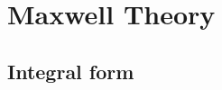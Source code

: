 
%

\def\red#1{{\color{red}#1}}
\def\blue#1{{\color{blue}#1}}
\def\green#1{{\color{green}#1}}

\usepackage{placeins}

\def\gap{38mm}

\usepackage{amsthm} %
\theoremstyle{definition}
\newtheorem{definition}{Definition}
\theoremstyle{plain}
\newtheorem{proposition}{Proposition}
\newtheorem{lemma}{Lemma}
\newtheorem{theorem}{Theorem}
\newtheorem{corollary}{Corollary}
\newtheorem{conjecture}{Conjecture}
\newtheorem{example}{Example}
\newtheorem{result}{Result}
\newtheorem{claim}{Claim}
\newtheorem*{result*}{Result}
\newtheorem{exercise}{Exercise}
\newtheorem{problem}{Problem}




\section{Maxwell Theory}
\subsection{Integral form}

